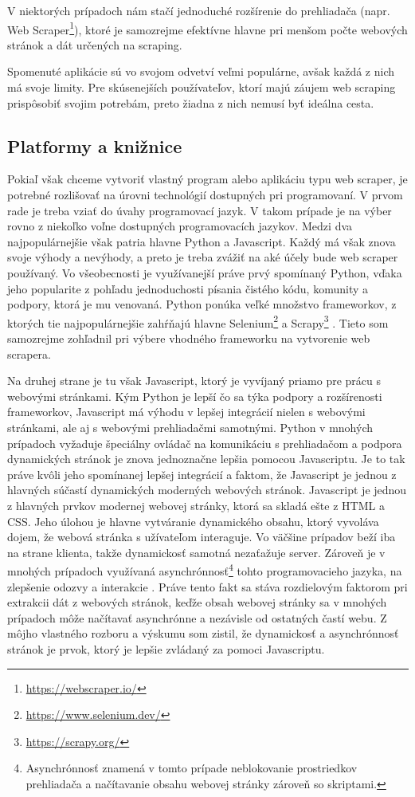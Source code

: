 V niektorých prípadoch nám stačí jednoduché rozšírenie do prehliadača (napr. Web Scraper\footnote{\url{https://webscraper.io/}}), ktoré je samozrejme efektívne hlavne pri menšom počte webových stránok a dát určených na scraping. 

Spomenuté aplikácie sú vo svojom odvetví veľmi populárne, avšak každá z nich má svoje limity. Pre skúsenejších používateľov, ktorí majú záujem web scraping prispôsobiť svojim potrebám, preto žiadna z nich nemusí byť ideálna cesta.

\subsection{Platformy a knižnice}

Pokiaľ však chceme vytvoriť vlastný program alebo aplikáciu typu web scraper, je potrebné rozlišovať na úrovni technológií dostupných pri programovaní. V prvom rade je treba vziať do úvahy programovací jazyk. V takom prípade je na výber rovno z niekoľko voľne dostupných programovacích jazykov. Medzi dva najpopulárnejšie však patria hlavne Python a Javascript. Každý má však znova svoje výhody a nevýhody, a preto je treba zvážiť na aké účely bude web scraper používaný. Vo všeobecnosti je využívanejší práve prvý spomínaný Python, vďaka jeho popularite z pohľadu jednoduchosti písania čistého kódu, komunity a podpory, ktorá je mu venovaná. Python ponúka veľké množstvo frameworkov, z ktorých tie najpopulárnejšie zahŕňajú hlavne Selenium\footnote{\url{https://www.selenium.dev/}} a Scrapy\footnote{\url{https://scrapy.org/}} \cite{The5Best}. Tieto som samozrejme zohľadnil pri výbere vhodného frameworku na vytvorenie web scrapera.

Na druhej strane je tu však Javascript, ktorý je vyvíjaný priamo pre prácu s webovými stránkami. Kým Python je lepší čo sa týka podpory a rozšírenosti frameworkov, Javascript má výhodu v lepšej integrácií nielen s webovými stránkami, ale aj s webovými prehliadačmi samotnými. Python v mnohých prípadoch vyžaduje špeciálny ovládač na komunikáciu s prehliadačom a podpora dynamických stránok je znova jednoznačne lepšia pomocou Javascriptu. Je to tak práve kvôli jeho spomínanej lepšej integrácií a faktom, že Javascript je jednou z hlavných súčastí dynamických moderných webových stránok. Javascript je jednou z hlavných prvkov modernej webovej stránky, ktorá sa skladá ešte z HTML a CSS. Jeho úlohou je hlavne vytváranie dynamického obsahu, ktorý vyvoláva dojem, že webová stránka s užívateľom interaguje. Vo väčšine prípadov beží iba na strane klienta, takže dynamickosť samotná nezaťažuje server. Zároveň je v mnohých prípadoch využívaná asynchrónnosť\footnote{Asynchrónnosť znamená v tomto prípade neblokovanie prostriedkov prehliadača a načítavanie obsahu webovej stránky zároveň so skriptami.} tohto programovacieho jazyka, na zlepšenie odozvy a interakcie \cite{Javascript}. Práve tento fakt sa stáva rozdielovým faktorom pri extrakcii dát z webových stránok, keďže obsah webovej stránky sa v mnohých prípadoch môže načítavať asynchrónne a nezávisle od ostatných častí webu. Z môjho vlastného rozboru a výskumu som zistil, že dynamickosť a asynchrónnosť stránok je prvok, ktorý je lepšie zvládaný za pomoci Javascriptu.

